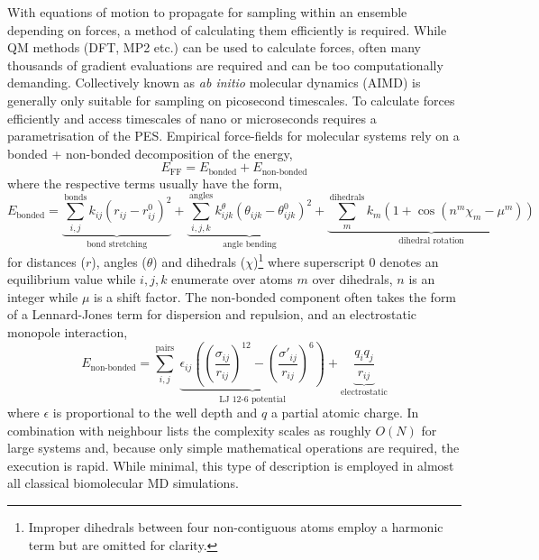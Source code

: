 \documentclass[main.tex]{subfiles}
\begin{document}
With equations of motion to propagate for sampling within an ensemble depending on forces, a method of calculating them efficiently is required. While QM methods (DFT, MP2 etc.) can be used to calculate forces, often many thousands of gradient evaluations are required and can be too computationally demanding. Collectively known as \emph{ab initio} molecular dynamics (AIMD) is generally only suitable for sampling on picosecond timescales.\cite{Iftimie2005} To calculate forces efficiently and access timescales of nano or microseconds requires a parametrisation of the PES. Empirical force-fields for molecular systems rely on a bonded + non-bonded decomposition of the energy,
\begin{equation}
	E_\text{FF} = E_\text{bonded} + E_\text{non-bonded}
\end{equation}
where the respective terms usually have the form,
\begin{equation}
	E_\text{bonded} = \underbrace{\sum_{i, j}^\text{bonds} k_{ij} (r_{ij} - r_{ij}^0)^2}_\text{bond stretching} + \underbrace{\sum_{i, j, k}^\text{angles} k^\theta_{ijk} (\theta_{ijk} - \theta_{ijk}^0)^2}_\text{angle bending} + \underbrace{\sum_{m}^\text{dihedrals} k_m (1 + \cos(n^m \chi_m - \mu^m))}_\text{dihedral rotation}
\end{equation}
for distances ($r$), angles ($\theta$) and dihedrals ($\chi$)\footnote{Improper dihedrals between four non-contiguous atoms employ a harmonic term but are omitted for clarity.} where superscript 0 denotes an equilibrium value while $i,j,k$ enumerate over atoms $m$ over dihedrals, $n$ is an integer while $\mu$ is a shift factor. The non-bonded component often takes the form of a Lennard-Jones term for dispersion and repulsion, and an electrostatic monopole interaction,
\begin{equation}
	E_\text{non-bonded} = \sum_{i, j}^\text{pairs} \; \underbrace{\epsilon_{ij} \left( \left(\frac{\sigma_{ij}}{r_{ij}}\right)^{12} - \left(\frac{\sigma'_{ij}}{r_{ij}}\right)^6 \right)}_\text{LJ 12-6 potential} + \underbrace{\frac{q_i q_j}{r_{ij}}}_\text{electrostatic}
\end{equation}
where $\epsilon$ is proportional to the well depth and $q$ a partial atomic charge.\cite{Guvench2008} In combination with neighbour lists the complexity scales as roughly $O(N)$ for large systems and, because only simple mathematical operations are required, the execution is rapid. While minimal, this type of description is employed in almost all classical biomolecular MD simulations.\cite{Schlick2021}
\end{document}
